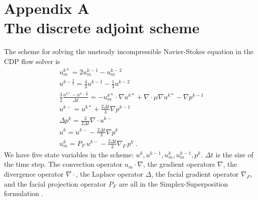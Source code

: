 \chapter*{Appendix A\\The discrete adjoint scheme}

\renewcommand{\theequation}{A.\arabic{equation}}
\setcounter{equation}{0}

The scheme for solving the unsteady incompressible Navier-Stokes equation in
the CDP flow solver is
\begin{equation} \begin{split} \label{nsscheme}
   & u_m^{k*} = 2 u_m^{k-1} - u_m^{k-2} \\
   & u^{k-\frac23} = \frac43 u^{k-1} - \frac13 u^{k-2}\\
   & \frac32 \frac{u^{k*} - u^{k-\frac23}}{\Delta t} =
 - u_m^{k*} \cdot \nabla u^{k*} + \nabla \cdot \mu \nabla u^{k*}
 - \nabla p^{k-1} \\
   & u^{k-} = u^{k*} + \frac{2 \Delta t}{3} \nabla p^{k-1} \\
   & \Delta p^k = \frac3{2 \Delta t} \nabla \cdot u^{k-} \\
   & u^k = u^{k-} - \frac{2 \Delta t}{3} \nabla p^k \\
   & u_m^k = P_F\, u^{k-} - \frac{2\Delta t}{3} \nabla_F\, p^k \;.
\end{split} \end{equation}
We have five state variables in the scheme:
$u^k, u^{k-1}, u_m^k, u_m^{k-1}, p^k$.
$\Delta t$ is the size of the time step.  The convection operator
$u_m \cdot \nabla$, the gradient operators $\nabla$,
the divergence operator $\nabla\cdot$, the Laplace operator $\Delta$, the
facial gradient operator $\nabla_F$, and the facial projection operator
$P_F$ are all in the Simplex-Superposition formulation \cite[]{ss}.


